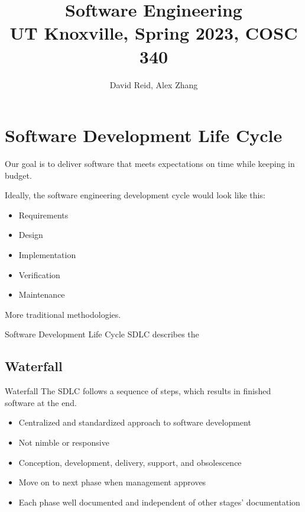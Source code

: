 \documentclass[12pt]{report}
\title{\textbf{Software Engineering}\\
\large UT Knoxville, Spring 2023, COSC 340}
\author{David Reid, Alex Zhang}
\begin{document}
\maketitle
\tableofcontents

\chapter{Software Development Life Cycle}
Our goal is to deliver software that meets expectations on time while keeping in budget.

Ideally, the software engineering development cycle would look like this:
\begin{itemize}
    \item Requirements
    \item Design
    \item Implementation
    \item Verification
    \item Maintenance
\end{itemize}

More traditional methodologies.

\begin{dfnbox}{Software Development Life Cycle}{}
    SDLC describes the
\end{dfnbox}

\section{Waterfall}

\begin{dfnbox}{Waterfall}{}
    The  SDLC follows a sequence of steps, which results in finished software at the end.
\end{dfnbox}

\begin{itemize}
    \item Centralized and standardized approach to software development
    \item Not nimble or responsive
    \item Conception, development, delivery, support, and obsolescence
    \item Move on to next phase when management approves
    \item Each phase well documented and independent of other stages' documentation
\end{itemize}
\end{document}
